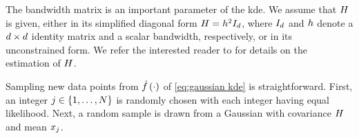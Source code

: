 The bandwidth matrix is an important parameter of the \ac{kde}. 
We assume that $H$ is given, either in its simplified diagonal form $H=h^2 I_{d}$, where $I_{d}$ and $h$ denote a $d\times d$ identity matrix and a scalar bandwidth, respectively, or in its unconstrained form.
We refer the interested reader to \autocite{turlach1993bandwidthselection, jones1996brief, duong2007ks, gramacki2017fft} for details on the estimation of $H$.

Sampling new data points from $\hat{f}\left( \cdot \right)$ of \cref{eq:gaussian kde} is straightforward.
First, an integer $j\in\{1,\ldots,N\}$ is randomly chosen with each integer having equal likelihood. 
Next, a random \cstarta sample is drawn from a Gaussian with covariance $H$ and mean $x_{j}$. \cenda

